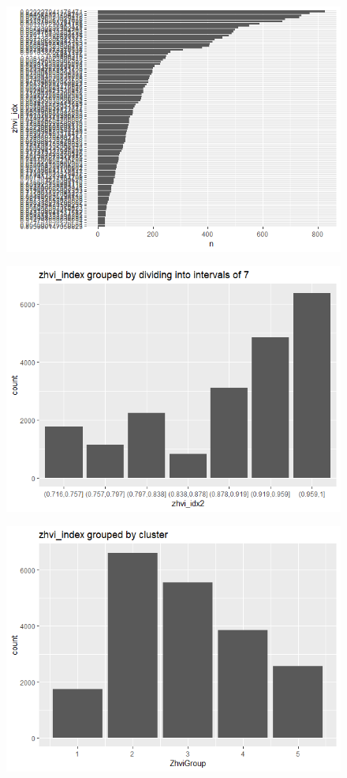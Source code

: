\documentclass[12pt,a4paper,landscape]{article}
\begin{document}
\begin{figure}[H]
	\centering
	\caption{}
	\label{fig:zhviindex-eploration}
	\includegraphics[width=0.8\linewidth]{"zhvi_index eploration"}
\end{figure}

\begin{figure}[H]
	\centering
	\caption{}
	\label{fig:zhviindex-grouped-by-automatic-intervals}
	\includegraphics[width=0.8\linewidth]{"zhvi_index grouped by automatic intervals"}
\end{figure}

\begin{figure}[H]
	\centering
	\caption{}
	\label{fig:zhviindex-grouped-by-cluster}
	\includegraphics[width=0.8\linewidth]{"zhvi_index grouped by cluster"}
\end{figure}
\end{document}
